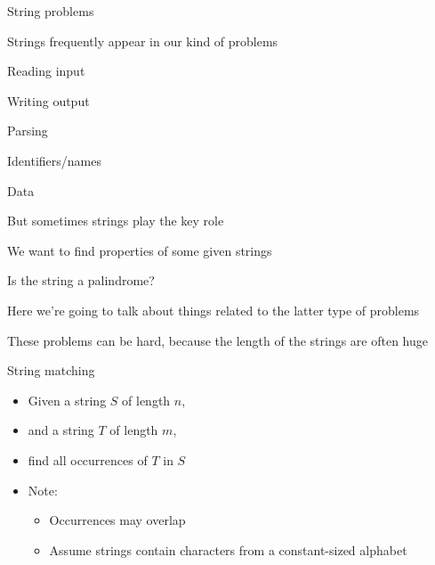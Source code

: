 \begin{frame}{String problems}
    \bi
        \item Strings frequently appear in our kind of problems
            \bi
                \item Reading input
                \item Writing output
                \item Parsing
                \item Identifiers/names
                \item Data
            \ei
        \vspace{5pt}
        \item But sometimes strings play the key role
            \bi
                \item We want to find properties of some given strings
                \item Is the string a palindrome?
            \ei
        \vspace{5pt}
        \item Here we're going to talk about things related to the latter type of problems
        \vspace{5pt}
        \item These problems can be hard, because the length of the strings are often huge
    \ei
\end{frame}

\begin{frame}{String matching}
	\begin{itemize}
		\item Given a string $S$ of length $n$,
		\item and a string $T$ of length $m$,
		\item find all occurrences of $T$ in $S$
    \end{itemize}
    \begin{itemize}
		\item Note:
        \begin{itemize}
            \item Occurrences may overlap
            \item Assume strings contain characters from a constant-sized alphabet
        \end{itemize}
	\end{itemize}
\end{frame}

